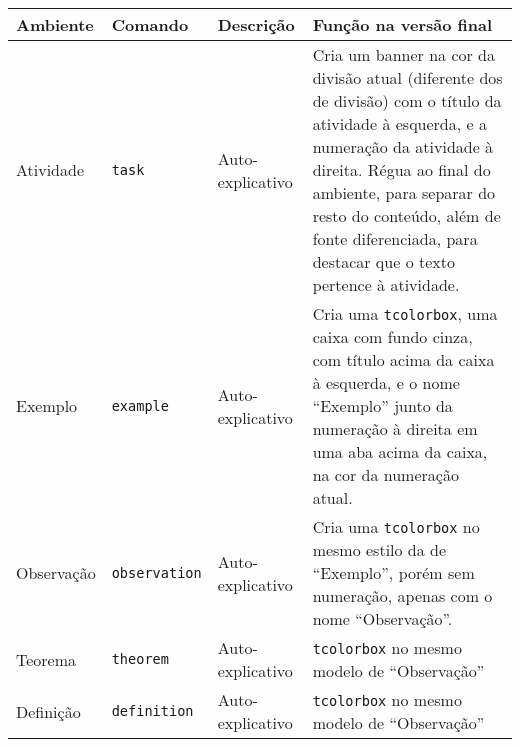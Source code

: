 \begin{table}[htp!]
	\centering\small
	\begin{tabular}
		{llp{.2\linewidth}p{.4\linewidth}}
		\toprule
		\centering Ambiente & \centering Comando & \centering Descrição                                             & \centering\arraybackslash Função na versão final                                                                                                                                                                                                                                         \\
		\midrule
		Atividade           & \verb|task|        & Auto-explicativo                                                 & Cria um banner na cor da divisão atual (diferente dos de divisão) com o título da atividade à esquerda, e a numeração da atividade à direita. Régua ao final do ambiente, para separar do resto do conteúdo, além de fonte diferenciada, para destacar que o texto pertence à atividade. \\
		\addlinespace
		Exemplo             & \verb|example|     & Auto-explicativo                                                 & Cria uma \verb|tcolorbox|, uma caixa com fundo cinza, com título acima da caixa à esquerda, e o nome \enquote{Exemplo} junto da numeração à direita em uma aba acima da caixa, na cor da numeração atual.                                                                                \\
		\addlinespace
		Observação          & \verb|observation| & Auto-explicativo                                                 & Cria uma \verb|tcolorbox| no mesmo estilo da de \enquote{Exemplo}, porém sem numeração, apenas com o nome \enquote{Observação}.                                                                                                                                                          \\
		\addlinespace
		Teorema             & \verb|theorem|     & Auto-explicativo                                                 & \verb|tcolorbox| no mesmo modelo de \enquote{Observação}                                                                                                                                                                                                                                 \\
		\addlinespace
		Definição           & \verb|definition|  & Auto-explicativo                                                 & \verb|tcolorbox| no mesmo modelo de \enquote{Observação}                                                                                                                                                                                                                                 \\

\end{tabular}
\end{table}
